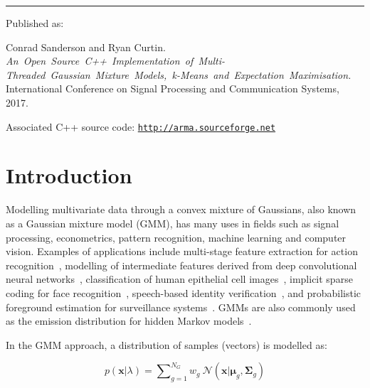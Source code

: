 \documentclass[10pt,a4paper]{article}
\def\Vec#1{{\boldsymbol{#1}}}
\def\Mat#1{{\boldsymbol{#1}}}
\begin{document}
\vfill
\hrule
\begin{small}
Published as:\\

\vspace{-2ex}
\begin{minipage}{0.9\textwidth}
Conrad Sanderson and Ryan Curtin.\\
\mbox{\it An Open Source C++ Implementation of Multi-Threaded Gaussian~Mixture~Models, k-Means and Expectation Maximisation.}\\
International Conference on Signal Processing and Communication Systems, 2017.
\end{minipage}

\vspace{2ex}

Associated C++ source code: \href{http://arma.sourceforge.net}{\tt http://arma.sourceforge.net}
\end{small}



\newpage

\section{Introduction}

Modelling multivariate data through a convex mixture of Gaussians, also known as a Gaussian mixture model (GMM),
has many uses in fields such as signal processing, econometrics, pattern recognition, machine learning and computer vision.
Examples of applications include
multi-stage feature extraction for action recognition~\cite{Carvajal_2016a},
modelling of intermediate features derived from deep convolutional neural networks~\cite{Ge_ICIP_2015,Ge_2016,LeCun_Nature_2015},
classification of human epithelial cell images~\cite{Wiliem_PR_2014},
implicit sparse coding for face recognition~\cite{Wong_2014},
speech-based identity verification~\cite{Reynolds_2000},
and probabilistic foreground estimation for surveillance systems~\cite{Reddy_2013}.
GMMs are also commonly used as the emission distribution for hidden Markov models~\cite{Bilmes98}.

In the GMM approach, a distribution of samples (vectors) is modelled as:

\begin{equation}
  p(\Vec{x} | \lambda) = \sum\nolimits_{g=1}^{N_G} w_g ~ {{\mathcal{N}}}( \Vec{x} | \Vec{\mu}_g, \Mat{\Sigma}_g )
  \label{eqn:gmm_prob}
\end{equation}%
\end{document}
